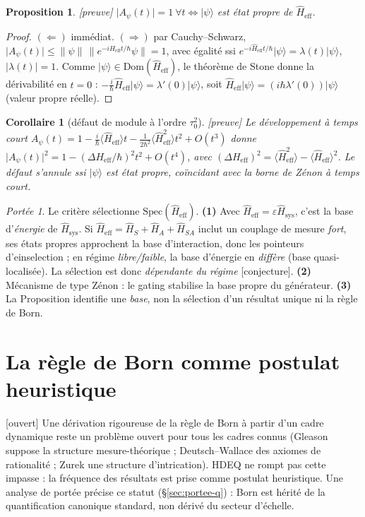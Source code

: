 \documentclass[11pt,a4paper]{article}
\newcommand{\ket}[1]{\lvert #1\rangle}
\newcommand{\Hsysop}{\hat{H}_{\mathrm{sys}}}
\newcommand{\Heff}{\hat{H}_{\mathrm{eff}}}
\newcommand{\statut}[1]{{\footnotesize\textsf{[#1]}}}
\theoremstyle{plain}
\newtheorem{proposition}{Proposition}
\newtheorem{corollary}{Corollaire}
\theoremstyle{definition}
\theoremstyle{remark}
\newtheorem*{scope}{Port\'ee}
\begin{document}
\begin{proposition}\label{prop:base}\statut{preuve}
$\lvert A_\psi(t)\rvert=1\ \forall t\iff\ket{\psi}$ est \'etat propre de $\Heff$.
\end{proposition}
\begin{proof}
$(\Leftarrow)$ imm\'ediat. $(\Rightarrow)$ par Cauchy--Schwarz,
$\lvert A_\psi(t)\rvert\le\lVert\psi\rVert\,\lVert e^{-i\Heff t/\hbar}\psi\rVert=1$,
avec \'egalit\'e ssi $e^{-i\Heff t/\hbar}\ket{\psi}=\lambda(t)\ket{\psi}$,
$\lvert\lambda(t)\rvert=1$. Comme $\ket{\psi}\in\mathrm{Dom}(\Heff)$, le th\'eor\`eme de
Stone donne la d\'erivabilit\'e en $t=0$ :
$-\tfrac{i}{\hbar}\Heff\ket{\psi}=\lambda'(0)\ket{\psi}$, soit
$\Heff\ket{\psi}=(i\hbar\lambda'(0))\ket{\psi}$ (valeur propre r\'eelle).
\end{proof}

\begin{corollary}[d\'efaut de module \`a l'ordre $\tau_0^2$]\statut{preuve}
Le d\'eveloppement \`a temps court $A_\psi(t)=1-\tfrac{i}{\hbar}\langle\Heff\rangle t-\tfrac{1}{2\hbar^2}\langle\Heff^2\rangle t^2+O(t^3)$ donne $\lvert A_\psi(t)\rvert^2=1-(\Delta H_{\mathrm{eff}}/\hbar)^2 t^2+O(t^4)$, avec
$(\Delta H_{\mathrm{eff}})^2=\langle\Heff^2\rangle-\langle\Heff\rangle^2$. Le d\'efaut
s'annule ssi $\ket{\psi}$ est \'etat propre, co\"incidant avec la borne de Zénon \`a
temps court.
\end{corollary}

\begin{scope}
Le crit\`ere s\'electionne $\mathrm{Spec}(\Heff)$. \textbf{(1)} Avec
$\Heff=\varepsilon\Hsysop$, c'est la base d'\emph{\'energie} de $\Hsysop$. Si
$\Heff=\hat H_S+\hat H_A+\hat H_{SA}$ inclut un couplage de mesure \emph{fort}, ses
\'etats propres approchent la base d'interaction, donc les pointeurs d'einselection ;
en r\'egime \emph{libre/faible}, la base d'\'energie en \emph{diff\`ere} (base
quasi-localis\'ee). La s\'election est donc \emph{d\'ependante du r\'egime}
\statut{conjecture}. \textbf{(2)} M\'ecanisme de type Zénon : le gating stabilise la
base propre du g\'en\'erateur. \textbf{(3)} La Proposition identifie une \emph{base},
non la s\'election d'un r\'esultat unique ni la r\`egle de Born.
\end{scope}

\section{La r\`egle de Born comme postulat heuristique}
\statut{ouvert} Une d\'erivation rigoureuse de la r\`egle de Born \`a partir d'un cadre
dynamique reste un probl\`eme ouvert pour tous les cadres connus (Gleason suppose la
structure mesure-th\'eorique ; Deutsch--Wallace des axiomes de rationalit\'e ; Zurek une
structure d'intrication). HDEQ ne rompt pas cette impasse : la fr\'equence des
r\'esultats est prise comme postulat heuristique. Une analyse de port\'ee pr\'ecise ce statut (\S\ref{sec:portee-q}) : Born est h\'erit\'e de la quantification canonique standard, non d\'eriv\'e du secteur d'\'echelle.
\end{document}

